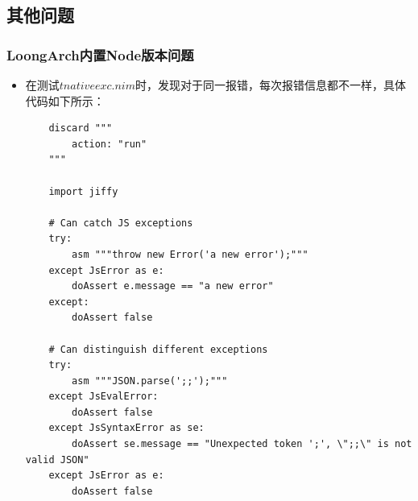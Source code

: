 \documentclass[UTF8]{ctexart}
\begin{document}
	\subsection{其他问题} %
		\subsubsection{LoongArch内置Node版本问题}  %
		\begin{itemize}[leftmargin=3.5em]
			\item 在测试$ tnativeexc.nim $时，发现对于同一报错，每次报错信息都不一样，具体代码如下所示：
			\begin{tcolorbox}[colback=gray!20, colframe=gray!20, rounded corners, boxrule=-5pt, height=0.72\textheight, width=0.9\textwidth, left=0pt, right=0pt, top=0pt, bottom=0pt]
				\begin{verbatim}
	discard """
		action: "run"
	"""
	
	import jiffy
	
	# Can catch JS exceptions
	try:
  		asm """throw new Error('a new error');"""
	except JsError as e:
  		doAssert e.message == "a new error"
	except:
  		doAssert false

	# Can distinguish different exceptions
	try:
  		asm """JSON.parse(';;');"""
	except JsEvalError:
  		doAssert false
	except JsSyntaxError as se:
  		doAssert se.message == "Unexpected token ';', \";;\" is not valid JSON"
	except JsError as e:
  		doAssert false


\end{verbatim}
\end{tcolorbox}
\end{itemize}
\end{document}
